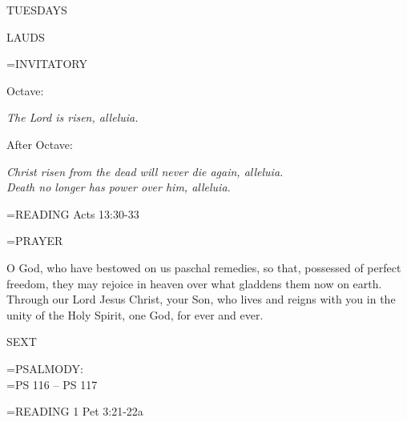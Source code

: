 \begin{center}
\normalsize \begin{center}\normalsize TUESDAYS\\
\end{center}
\end{center}

\begin{flushleft}\normalsize LAUDS\\\end{flushleft}

\hangindent=\parindent \small{INVITATORY}
\begin{center}
\end{center}Octave:\begin{center}\textit{	The Lord is risen, alleluia.\\}
\end{center}After Octave:\begin{center}\textit{	Christ risen from the dead will never die again, alleluia.\\}
\textit{Death no longer has power over him, alleluia.\\}
\end{center}

\hangindent=\parindent \small{READING}    Acts 13:30-33 \textbf{   \\}

\hangindent=\parindent \small PRAYER
\begin{description}[labelindent=\parindent, noitemsep, leftmargin=*]
\item [Octave:] 	O God, who have bestowed on us paschal remedies, so that, possessed of perfect freedom, they may rejoice in heaven over what gladdens them now on earth. Through our Lord Jesus Christ, your Son, who lives and reigns with you in the unity of the Holy Spirit, one God, for ever and ever.
\item [After Octave:] 	
\end{description}

\begin{flushleft}\normalsize SEXT\\\end{flushleft}

\hangindent=\parindent \small{PSALMODY:}\\
\hangindent=\parindent  PS 116 -- PS 117\vspace{0.5em}

\hangindent=\parindent \small{READING}    1 Pet 3:21-22a \textbf{   }

